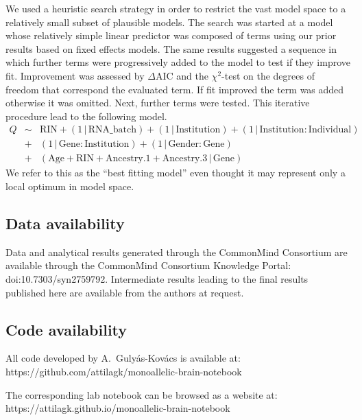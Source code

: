\documentclass[letterpaper]{article}
\begin{document}
We used a heuristic search strategy in order to restrict
the vast model space to a relatively small subset of plausible models.  The
search was started at a model whose relatively simple linear predictor was composed of terms
using our prior results based on fixed effects models.  The same results
suggested a sequence in which further terms were progressively added to the
model to test if they improve fit.  Improvement was assessed by \(\Delta
\mathrm{AIC}\) and the \(\chi^2\)-test on the degrees of freedom that
correspond the evaluated term.  If fit improved the term was added otherwise
it was omitted.  Next, further terms were tested.  This iterative procedure
lead to the following model.
\begin{eqnarray*}
Q &\sim&
\mathrm{RIN} + (1 \,|\, \mathrm{RNA\_batch}) + (1 \,|\, \mathrm{Institution}) + (1 \,|\,
\mathrm{Institution}:\mathrm{Individual}) \\
&+& (1 \,|\, \mathrm{Gene}:\mathrm{Institution}) + (1 \,|\, \mathrm{Gender}:\mathrm{Gene}) \\
&+& (\mathrm{Age} + \mathrm{RIN} + \mathrm{Ancestry.1} + \mathrm{Ancestry.3} \,|\, \mathrm{Gene})
\end{eqnarray*}
We refer to this as the ``best
fitting model'' even thought it may represent only a local optimum in model
space.

\subsection*{Data availability}

Data and analytical results generated through the CommonMind Consortium are
available through the CommonMind Consortium Knowledge Portal:
doi:10.7303/syn2759792.  Intermediate results leading to the final results
published here are available from the authors at request.

\subsection*{Code availability}

All code developed by A.~Guly\'{a}s-Kov\'{a}cs is available at:\\
https://github.com/attilagk/monoallelic-brain-notebook

The corresponding lab
notebook can be browsed as a website at:\\
https://attilagk.github.io/monoallelic-brain-notebook
\end{document}
